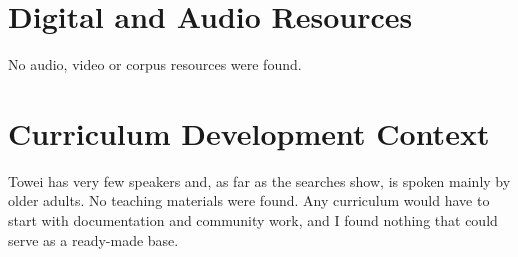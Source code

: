 \documentclass[12pt]{article}
\begin{document}
\section{Digital and Audio Resources}
No audio, video or corpus resources were found.

\section{Curriculum Development Context}
Towei has very few speakers and, as far as the searches show, is spoken mainly by older adults. No teaching materials were found. Any curriculum would have to start with documentation and community work, and I found nothing that could serve as a ready-made base.
\end{document}
